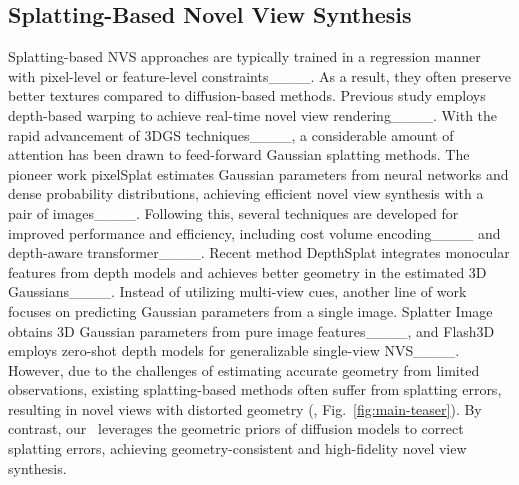 \subsection{Splatting-Based Novel View Synthesis}
Splatting-based NVS approaches are typically trained in a regression manner with pixel-level or feature-level constraints____. As a result, they often preserve better textures compared to diffusion-based methods. Previous study employs depth-based warping to achieve real-time novel view rendering____. With the rapid advancement of 3DGS techniques____, a considerable amount of attention has been drawn to feed-forward Gaussian splatting methods. The pioneer work pixelSplat estimates Gaussian parameters from neural networks and dense probability distributions, achieving efficient novel view synthesis with a pair of images____. Following this, several techniques are developed for improved performance and efficiency, including cost volume encoding____ and depth-aware transformer____. Recent method DepthSplat integrates monocular features from depth models and achieves better geometry in the estimated 3D Gaussians____. Instead of utilizing multi-view cues, another line of work focuses on predicting Gaussian parameters from a single image. Splatter Image obtains 3D Gaussian parameters from pure image features____, and Flash3D employs zero-shot depth models for generalizable single-view NVS____. 
However, due to the challenges of estimating accurate geometry from limited observations, existing splatting-based methods often suffer from splatting errors, resulting in novel views with distorted geometry (\eg, Fig.~\ref{fig:main-teaser}). By contrast, our \method\ leverages the geometric priors of diffusion models to correct splatting errors, achieving geometry-consistent and high-fidelity novel view synthesis.



